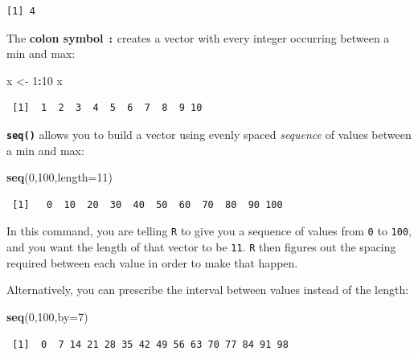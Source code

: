\documentclass[
]{book}
\newenvironment{Shaded}{\begin{snugshade}}{\end{snugshade}}
\newcommand{\DataTypeTok}[1]{\textcolor[rgb]{0.13,0.29,0.53}{#1}}
\newcommand{\DecValTok}[1]{\textcolor[rgb]{0.00,0.00,0.81}{#1}}
\newcommand{\KeywordTok}[1]{\textcolor[rgb]{0.13,0.29,0.53}{\textbf{#1}}}
\newcommand{\NormalTok}[1]{#1}
\newcommand{\OperatorTok}[1]{\textcolor[rgb]{0.81,0.36,0.00}{\textbf{#1}}}
\newcommand{\StringTok}[1]{\textcolor[rgb]{0.31,0.60,0.02}{#1}}
\begin{document}
\begin{verbatim}
[1] 4
\end{verbatim}

The \textbf{colon symbol \texttt{:}} creates a vector with every integer occurring between a min and max:

\begin{Shaded}
\begin{Highlighting}[]
\NormalTok{x <-}\StringTok{ }\DecValTok{1}\OperatorTok{:}\DecValTok{10}
\NormalTok{x}
\end{Highlighting}
\end{Shaded}

\begin{verbatim}
 [1]  1  2  3  4  5  6  7  8  9 10
\end{verbatim}

\textbf{\texttt{seq()}} allows you to build a vector using evenly spaced \emph{sequence} of values between a min and max:

\begin{Shaded}
\begin{Highlighting}[]
\KeywordTok{seq}\NormalTok{(}\DecValTok{0}\NormalTok{,}\DecValTok{100}\NormalTok{,}\DataTypeTok{length=}\DecValTok{11}\NormalTok{)}
\end{Highlighting}
\end{Shaded}

\begin{verbatim}
 [1]   0  10  20  30  40  50  60  70  80  90 100
\end{verbatim}

In this command, you are telling \texttt{R} to give you a sequence of values from \texttt{0} to \texttt{100}, and you want the length of that vector to be \texttt{11}. \texttt{R} then figures out the spacing required between each value in order to make that happen.

Alternatively, you can prescribe the interval between values instead of the length:

\begin{Shaded}
\begin{Highlighting}[]
\KeywordTok{seq}\NormalTok{(}\DecValTok{0}\NormalTok{,}\DecValTok{100}\NormalTok{,}\DataTypeTok{by=}\DecValTok{7}\NormalTok{)}
\end{Highlighting}
\end{Shaded}

\begin{verbatim}
 [1]  0  7 14 21 28 35 42 49 56 63 70 77 84 91 98
\end{verbatim}
\end{document}

